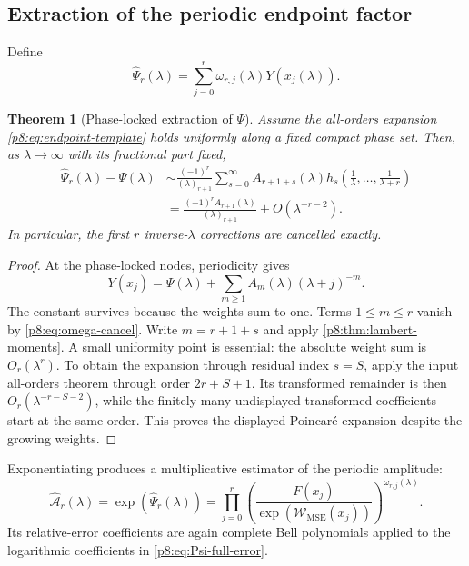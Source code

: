 \documentclass[11pt]{article}
\numberwithin{equation}{section}
\newtheorem{theorem}{Theorem}[section]
\theoremstyle{definition}
\theoremstyle{remark}
\begin{document}
\subsection{Extraction of the periodic endpoint factor}

Define
\begin{equation}
\widehat\Psi_r(\lambda)
=\sum_{j=0}^{r}\omega_{r,j}(\lambda)Y(x_j(\lambda)).
\label{p8:eq:Psi-hat}
\end{equation}

\begin{theorem}[Phase-locked extraction of $\Psi$]
\label{p8:thm:Psi-extraction}
Assume the all-orders expansion \cref{p8:eq:endpoint-template} holds uniformly along a fixed compact phase set. Then, as $\lambda\to\infty$ with its fractional part fixed,
\begin{align}
\widehat\Psi_r(\lambda)-\Psi(\lambda)
&\sim \frac{(-1)^r}{(\lambda)_{r+1}}
\sum_{s=0}^{\infty}A_{r+1+s}(\lambda)
 h_s\!\left(\frac1\lambda,\ldots,\frac1{\lambda+r}\right)
\label{p8:eq:Psi-full-error}\\
&=\frac{(-1)^rA_{r+1}(\lambda)}{(\lambda)_{r+1}}
+O(\lambda^{-r-2}).
\label{p8:eq:Psi-leading-error}
\end{align}
In particular, the first $r$ inverse-$\lambda$ corrections are cancelled exactly.
\end{theorem}

\begin{proof}
At the phase-locked nodes, periodicity gives
\[
Y(x_j)=\Psi(\lambda)+\sum_{m\ge1}A_m(\lambda)(\lambda+j)^{-m}.
\]
The constant survives because the weights sum to one. Terms $1\le m\le r$ vanish by \cref{p8:eq:omega-cancel}. Write $m=r+1+s$ and apply \cref{p8:thm:lambert-moments}. A small uniformity point is essential: the absolute weight sum is $O_r(\lambda^r)$. To obtain the expansion through residual index $s=S$, apply the input all-orders theorem through order $2r+S+1$. Its transformed remainder is then $O_r(\lambda^{-r-S-2})$, while the finitely many undisplayed transformed coefficients start at the same order. This proves the displayed Poincar\'e expansion despite the growing weights.
\end{proof}

Exponentiating produces a multiplicative estimator of the periodic amplitude:
\begin{equation}
\widehat{\mathcal A}_r(\lambda)
=\exp(\widehat\Psi_r(\lambda))
=\prod_{j=0}^{r}
\left(\frac{F(x_j)}{\exp(\mathcal W_{\mathrm{MSE}}(x_j))}
\right)^{\omega_{r,j}(\lambda)}.
\label{p8:eq:Ahat}
\end{equation}
Its relative-error coefficients are again complete Bell polynomials applied to the logarithmic coefficients in \cref{p8:eq:Psi-full-error}.
\end{document}
